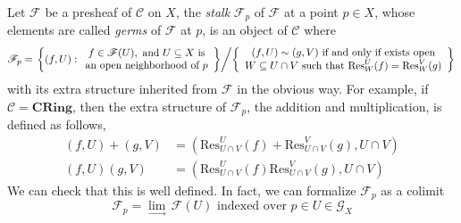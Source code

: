 \documentclass[11pt]{book}
\begin{document}
\begin{definition}Let $\mathscr{F}$ be a presheaf of $\mathcal C$ on $X$, the \textit{stalk} $\mathscr{F}_p$ of $\mathscr{F}$ at a point $p\in X$, whose elements are called \textit{germs} of $\mathscr{F}$ at $p$, is an object of $\mathcal C$ where
\[\mathscr{F}_p=\left.\left\{(f,U):\begin{array}{c}f\in\mathscr{F}(U),\textrm{\ and\ }U\subseteq X\textrm{\ is}\\\textrm{an\ open\ neighborhood\ of\ }p\end{array}\right\} \middle/ \left\{\begin{array}{c}(f,U)\sim (g,V)\textrm{\ if\ and\ only\ if\ exists\ open}\\W\subseteq U\cap V\textrm{\ such\ that\ }\mathrm{Res}^U_W(f)=\mathrm{Res}^V_W(g)\end{array}\right\}\right.\]
with its extra structure inherited from $\mathscr{F}$ in the obvious way. For example, if $\mathcal C=\mathbf{CRing}$, then the extra structure of $\mathscr{F}_p$, the addition and multiplication, is defined as follows,
\[\begin{aligned} (f,U)+(g,V)&=(\mathrm{Res}^U_{U\cap V}(f)+\mathrm{Res}^V_{U\cap V}(g),U\cap V)\\ (f,U)(g,V)&=(\mathrm{Res}^U_{U\cap V}(f)\mathrm{Res}^V_{U\cap V}(g),U\cap V)\end{aligned}\]
We can check that this is well defined. In fact, we can formalize $\mathscr{F}_p$ as a colimit
\[\mathscr{F}_p=\lim_{\longrightarrow}\,\mathscr{F}(U)\textrm{\ indexed\ over\ }p\in U\in\mathcal G_X\]

\end{definition}
\end{document}
